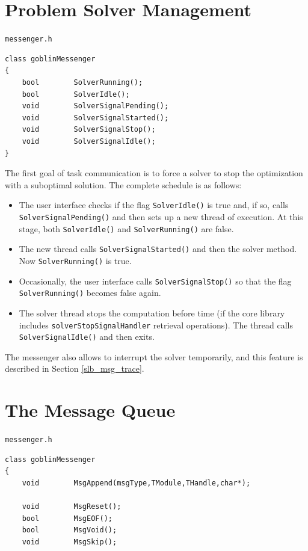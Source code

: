 \documentclass[a4paper,11pt,twoside]{book}
\begin{document}
\begin{multicols}{2}
\section{Problem Solver Management}
\label{slb_solver_signals}
\myinclude\verb/messenger.h/
\begin{mymethods}
\begin{verbatim}
class goblinMessenger
{
    bool        SolverRunning();
    bool        SolverIdle();
    void        SolverSignalPending();
    void        SolverSignalStarted();
    void        SolverSignalStop();
    void        SolverSignalIdle();
}
\end{verbatim}
\end{mymethods}
The first goal of task communication is to force a solver to stop the
optimization with a suboptimal solution. The complete schedule is as follows:
\begin{itemize}
\item The user interface checks if the flag \verb/SolverIdle()/ is true and,
    if so, calls \verb/SolverSignalPending()/ and then sets up a new thread of
    execution. At this stage, both \verb/SolverIdle()/ and \verb/SolverRunning()/
    are false.
\item The new thread calls \verb/SolverSignalStarted()/ and then the solver
    method. Now \verb/SolverRunning()/ is true.
\item Occasionally, the user interface calls \verb/SolverSignalStop()/ so that
    the flag \verb/SolverRunning()/ becomes false again.
\item The solver thread stops the computation before time (if the core library
    includes \verb/solverStopSignalHandler/ retrieval operations). The thread
    calls \verb/SolverSignalIdle()/ and then exits.
\end{itemize}
The messenger also allows to interrupt the solver temporarily, and this feature
is described in Section \ref{slb_msg_trace}.


\newpage
{}
\section{The Message Queue}
\label{slb_msg_queue}
\myinclude\verb/messenger.h/
\begin{mymethods}
\begin{verbatim}
class goblinMessenger
{
    void        MsgAppend(msgType,TModule,THandle,char*);

    void        MsgReset();
    bool        MsgEOF();
    bool        MsgVoid();
    void        MsgSkip();


\end{verbatim}
\end{mymethods}
\end{multicols}
\end{document}
